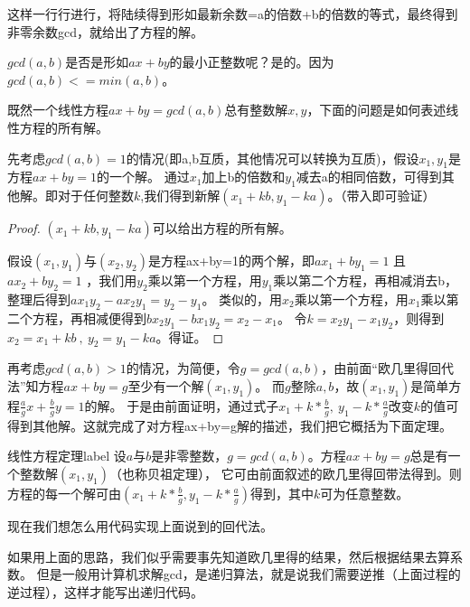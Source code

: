 {\heiti 这样一行行进行，将陆续得到形如最新余数=a的倍数+b的倍数的等式，最终得到非零余数gcd，就给出了方程的解。}

\begin{note}
$gcd(a,b)$是否是形如$ax+by$的最小正整数呢？是的。因为$gcd(a,b)<=min(a,b)$。
\end{note}

\vbox{}

既然一个线性方程$ax+by=gcd(a,b)$总有整数解$x,y$，下面的问题是{\heiti 如何表述线性方程的所有解}。

先考虑$gcd(a,b)=1$的情况(即a,b互质，其他情况可以转换为互质)，假设$x_1,y_1$是方程$ax+by=1$的一个解。
通过$x_1$加上b的倍数和$y_1$减去a的相同倍数，可得到其他解。即对于任何整数$k$,我们得到新解$(x_{1}+kb,y_{1}-ka)$。（带入即可验证）

\begin{proof}
	$(x_{1}+kb,y_{1}-ka)$可以给出方程的{\heiti 所有}解。
	
	假设$(x_{1},y_{1})$与$(x_{2},y_{2})$是方程ax+by=1的两个解，即$ax_{1}+by_{1}=1$ 且$ ax_{2}+by_{2}=1$ ，我们用$y_{2}$乘以第一个方程，用$y_{1}$乘以第二个方程，再相减消去b，整理后得到$ax_{1}y_{2}-ax_{2}y_{1}=y_{2}-y_{1}$。
	类似的，用$x_{2}$乘以第一个方程，用$x_{1}$乘以第二个方程，再相减便得到$bx_{2}y_{1}-bx_{1}y_{2}=x_{2}-x_{1}$。
	令$k=x_{2}y_{1}-x_{1}y_{2}$，则得到$x_{2}=x_{1}+kb \ ,\  y_{2}=y_{1}-ka$。得证。
\end{proof}

\vbox{}

再考虑$gcd(a,b)>1$的情况，为简便，令$g=gcd(a,b)$，由前面“欧几里得回代法”知方程$ax+by=g$至少有一个解$(x_{1},y_{1})$。
{\heiti 而$g$整除$a,b$}，故$(x_{1},y_{1})$是简单方程$\frac{a}{g}x+\frac{b}{g}y=1$的解。
于是由前面证明，通过式子$x_1+k*\frac{b}{g},\ y_1-k*\frac{a}{g}$改变$k$的值可得到其他解。这就完成了对方程ax+by=g解的描述，我们把它概括为下面定理。


\begin{theorem}{线性方程定理}{label}
设$a$与$b$是非零整数，$g=gcd(a,b)$。方程$ax+by=g$总是有一个整数解$(x_{1},y_{1})$（也称贝祖定理），
它可由前面叙述的欧几里得回带法得到。则方程的每一个解可由$(x_{1}+k*\frac{b}{g},y_{1}-k*\frac{a}{g})$得到，其中$k$可为任意整数。
\end{theorem}

\vbox{}

现在我们想怎么用代码实现上面说到的回代法。

如果用上面的思路，我们似乎需要事先知道欧几里得的结果，然后根据结果去算系数。
但是一般用计算机求解gcd，是递归算法，就是说我们需要逆推（上面过程的逆过程），这样才能写出递归代码。

